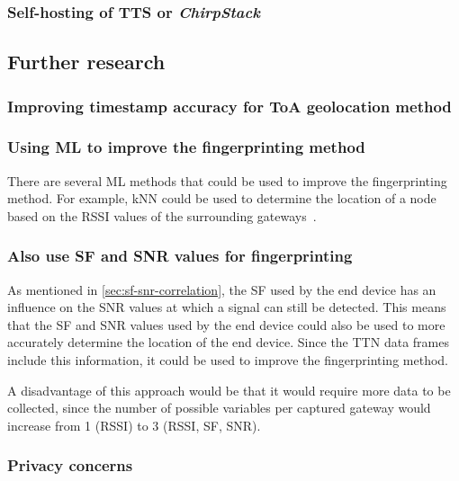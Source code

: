 \subsubsection{Self-hosting of \acs{TTS} or \emph{ChirpStack}}


\subsection{Further research}

\subsubsection{Improving timestamp accuracy for \acf{ToA} geolocation method}


\subsubsection{Using \acf{ML} to improve the fingerprinting method}


There are several \ac{ML} methods that could be used to improve the fingerprinting method.
For example, \ac{kNN} could be used to determine the location of a node based on the \ac{RSSI} values of the surrounding gateways~\cite{anagnostopoulos_reproducible_2019}.

\subsubsection{Also use \ac{SF} and \ac{SNR} values for fingerprinting}

As mentioned in \cref{sec:sf-snr-correlation}, the \ac{SF} used by the end device has an influence on the \ac{SNR} values at which a signal can still be detected.
This means that the \ac{SF} and \ac{SNR} values used by the end device could also be used to more accurately determine the location of the end device.
Since the \ac{TTN} data frames include this information, it could be used to improve the fingerprinting method.

A disadvantage of this approach would be that it would require more data to be collected, since the number of possible variables per captured gateway would increase from 1 (\ac{RSSI}) to 3 (\ac{RSSI}, \ac{SF}, \ac{SNR}).

\subsubsection{Privacy concerns}


